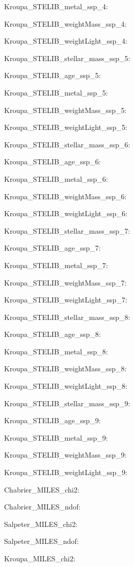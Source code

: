 \item Kroupa\_STELIB\_metal\_ssp\_4: 
\item Kroupa\_STELIB\_weightMass\_ssp\_4: 
\item Kroupa\_STELIB\_weightLight\_ssp\_4: 
\item Kroupa\_STELIB\_stellar\_mass\_ssp\_5: 
\item Kroupa\_STELIB\_age\_ssp\_5: 
\item Kroupa\_STELIB\_metal\_ssp\_5: 
\item Kroupa\_STELIB\_weightMass\_ssp\_5: 
\item Kroupa\_STELIB\_weightLight\_ssp\_5: 
\item Kroupa\_STELIB\_stellar\_mass\_ssp\_6: 
\item Kroupa\_STELIB\_age\_ssp\_6: 
\item Kroupa\_STELIB\_metal\_ssp\_6: 
\item Kroupa\_STELIB\_weightMass\_ssp\_6: 
\item Kroupa\_STELIB\_weightLight\_ssp\_6: 
\item Kroupa\_STELIB\_stellar\_mass\_ssp\_7: 
\item Kroupa\_STELIB\_age\_ssp\_7: 
\item Kroupa\_STELIB\_metal\_ssp\_7: 
\item Kroupa\_STELIB\_weightMass\_ssp\_7: 
\item Kroupa\_STELIB\_weightLight\_ssp\_7: 
\item Kroupa\_STELIB\_stellar\_mass\_ssp\_8: 
\item Kroupa\_STELIB\_age\_ssp\_8: 
\item Kroupa\_STELIB\_metal\_ssp\_8: 
\item Kroupa\_STELIB\_weightMass\_ssp\_8: 
\item Kroupa\_STELIB\_weightLight\_ssp\_8: 
\item Kroupa\_STELIB\_stellar\_mass\_ssp\_9: 
\item Kroupa\_STELIB\_age\_ssp\_9: 
\item Kroupa\_STELIB\_metal\_ssp\_9: 
\item Kroupa\_STELIB\_weightMass\_ssp\_9: 
\item Kroupa\_STELIB\_weightLight\_ssp\_9: 
\item Chabrier\_MILES\_chi2: 
\item Chabrier\_MILES\_ndof: 
\item Salpeter\_MILES\_chi2: 
\item Salpeter\_MILES\_ndof: 
\item Kroupa\_MILES\_chi2: 

